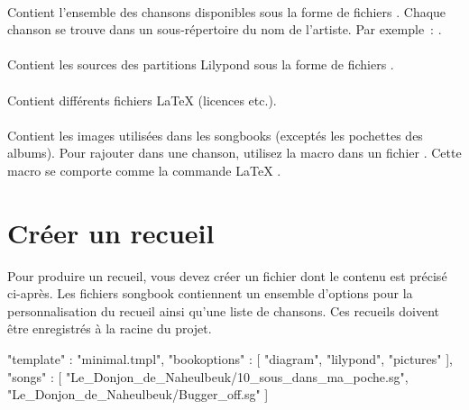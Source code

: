 \paragraph{}
Contient l'ensemble des chansons disponibles sous la forme de fichiers
. Chaque chanson se trouve dans un sous-répertoire du nom
de l'artiste. Par exemple~:
.

\paragraph{}
Contient les sources des partitions Lilypond sous la forme de fichiers
.

\paragraph{}
Contient différents fichiers \LaTeX{} (licences etc.).

\paragraph{}
Contient les images utilisées dans les songbooks (exceptés les
pochettes des albums). Pour rajouter  dans une
chanson, utilisez la macro  dans un fichier
. Cette macro se comporte comme la commande \LaTeX{}
.

\begin{songbook}
\end{songbook}

\section{Créer un recueil}
\label{sb:create-songbook}

Pour produire un recueil, vous devez créer un fichier 
dont le contenu est précisé ci-après. Les fichiers songbook
 contiennent un ensemble d'options pour la
personnalisation du recueil ainsi qu'une liste de chansons.
Ces recueils doivent être enregistrés à la racine du projet.

\begin{code}
{
"template" : "minimal.tmpl",
"bookoptions" : [
    "diagram",
    "lilypond",
    "pictures"
  ],
"songs" : [
    "Le_Donjon_de_Naheulbeuk/10_sous_dans_ma_poche.sg",
    "Le_Donjon_de_Naheulbeuk/Bugger_off.sg"
  ]
}
\end{code}

